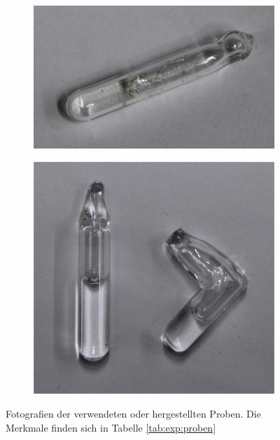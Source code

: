 \begin{figure}[H]
\begin{subfigure}{.24\textwidth}
		\caption{ }
		\label{fig:exp:probe_b}
	\end{subfigure}
	\begin{subfigure}{.24\textwidth}
		\centering
		\includegraphics[width=\textwidth]{graphics/proben/CRN_neu.jpg}
		\caption{ }
		\label{fig:exp:probe_c}
	\end{subfigure}
	\begin{subfigure}{.24\textwidth}
		\centering
		\includegraphics[width=\textwidth]{graphics/proben/RbCl_in_D20.jpg}
		\caption{ }
		\label{fig:exp:probe_d}
	\end{subfigure}
	\caption{Fotografien der verwendeten oder hergestellten Proben. Die Merkmale finden sich in Tabelle \ref{tab:exp:proben}}
	\label{fig:exp:proben}
\end{figure}

